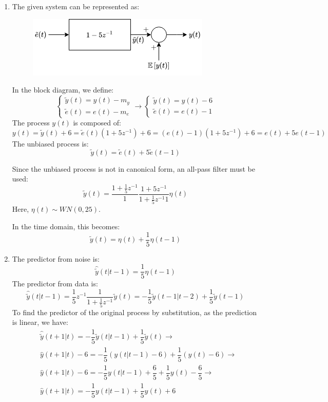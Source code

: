\begin{enumerate}
    \item The given system can be represented as:
        \begin{figure}[H]
            \centering
            \includegraphics[width=0.5\linewidth]{images/bias.png}
        \end{figure}
        In the block diagram, we define:
        \[\begin{cases}
            \tilde{y}(t)=y(t)-m_y \\
            \tilde{e}(t)=e(t)-m_e 
        \end{cases}\rightarrow \begin{cases}
            \tilde{y}(t)=y(t)-6 \\
            \tilde{e}(t)=e(t)-1 
        \end{cases}\]
        The process $y(t)$ is composed of:
        \[y(t)=\tilde{y}(t)+6=\tilde{e}(t)\left( 1+5z^{-1} \right)+6=\left(e(t)-1\right)\left( 1+5z^{-1} \right)+6=e(t)+5e(t-1)\]
        The unbiased process is:
        \[\tilde{y}(t)=\tilde{e}(t)+5\tilde{e}(t-1)\]
        
        Since the unbiased process is not in canonical form, an all-pass filter must be used: 
        \[\tilde{y}(t)=\dfrac{1+\frac{1}{5}z^{-1}}{1}\dfrac{1+5z^{-1}}{1+\frac{1}{5}z^{-1}1}\eta(t)\]
        Here, $\eta(t)\sim WN(0,25)$. 
        
        In the time domain, this becomes: 
        \[\tilde{y}(t)=\eta(t)+\dfrac{1}{5}\eta(t-1)\]
    \item The predictor from noise is: 
        \[\hat{\tilde{y}}(t|t-1)=\dfrac{1}{5}\eta(t-1)\]
        The predictor from data is: 
        \[\hat{\tilde{y}}(t|t-1)=\dfrac{1}{5}z^{-1}\dfrac{1}{1+\frac{1}{5}z^{-1}}\tilde{y}(t)=-\dfrac{1}{5}\tilde{y}(t-1|t-2)+\dfrac{1}{5}\tilde{y}(t-1)\]
        To find the predictor of the original process by substitution, as the prediction is linear, we have:
        \begin{align*}
            &\hat{\tilde{y}}(t+1|t)=-\dfrac{1}{5}\tilde{y}(t|t-1)+\dfrac{1}{5}\tilde{y}(t) \rightarrow \\
            &\hat{y}(t+1|t)-6=-\dfrac{1}{5}\left(y(t|t-1)-6\right)+\dfrac{1}{5}\left(y(t)-6\right) \rightarrow \\
            &\hat{y}(t+1|t)-6=-\dfrac{1}{5}y(t|t-1)+\dfrac{6}{5}+\dfrac{1}{5}y(t)-\dfrac{6}{5} \rightarrow \\
            &\hat{y}(t+1|t)=-\dfrac{1}{5}y(t|t-1)+\dfrac{1}{5}y(t)+6
        \end{align*}
\end{enumerate}